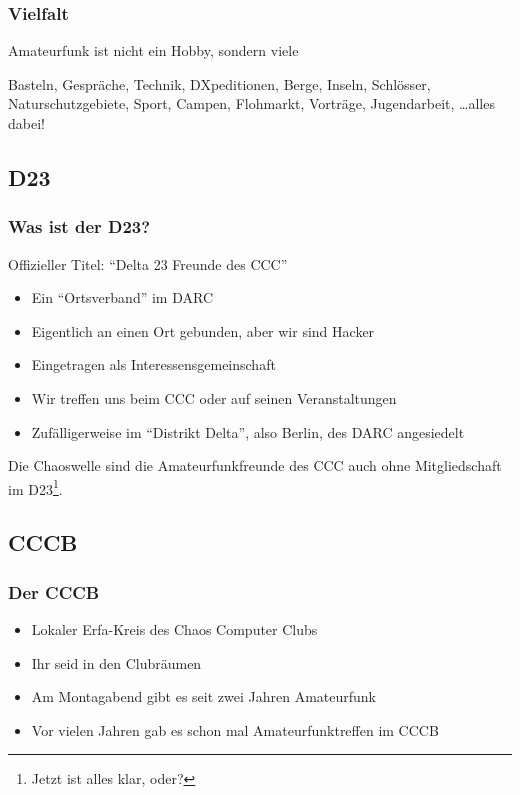\begin{frame}
  \frametitle{Vielfalt}

  \begin{exampleblock}{}
    Amateurfunk ist nicht ein Hobby, sondern viele
  \end{exampleblock}

  Basteln, Gespräche, Technik, DXpeditionen, Berge, Inseln, Schlösser, Naturschutzgebiete, Sport, Campen, Flohmarkt, Vorträge, Jugendarbeit, \ldots alles dabei!
\end{frame}

\subsection{D23}

\begin{frame}
  \frametitle{Was ist der D23?}

  Offizieller Titel: "`Delta 23 Freunde des CCC"'

  \begin{itemize}
    \item Ein "`Ortsverband"' im DARC
    \item Eigentlich an einen Ort gebunden, aber wir sind Hacker
    \item Eingetragen als Interessensgemeinschaft
    \item Wir treffen uns beim CCC oder auf seinen Veranstaltungen
    \item Zufälligerweise im "`Distrikt Delta"', also Berlin, des DARC angesiedelt
  \end{itemize}

  Die Chaoswelle sind die Amateurfunkfreunde des CCC auch ohne Mitgliedschaft im D23\footnote{Jetzt ist alles klar, oder?}.
\end{frame}

\subsection{CCCB}

\begin{frame}
  \frametitle{Der CCCB}

  \begin{itemize}
    \item Lokaler Erfa-Kreis des Chaos Computer Clubs
    \item Ihr seid in den Clubräumen
    \item Am Montagabend gibt es seit zwei Jahren Amateurfunk
    \item Vor vielen Jahren gab es schon mal Amateurfunktreffen im CCCB
  \end{itemize}
\end{frame}

